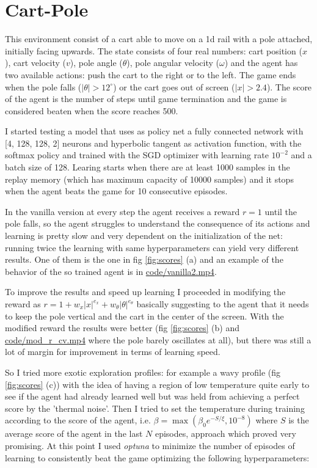 \documentclass[a4paper, 11pt]{article}
\begin{document}
\section{Cart-Pole}
  This environment consist of a cart able to move on a 1d rail with a pole attached, initially facing upwards. The state consists of four real numbers: cart position ($x$), cart velocity ($v$), pole angle ($\theta$), pole angular velocity ($\omega$) and the agent has two available actions: push the cart to the right or to the left. The game ends when the pole falls ($|\theta| > 12^{\circ}$) or the cart goes out of screen ($|x| > 2.4$). The score of the agent is the number of steps until game termination and the game is considered beaten when the score reaches 500.

  I started testing a model that uses as policy net a fully connected network with [4, 128, 128, 2] neurons and hyperbolic tangent as activation function, with the softmax policy and trained with the SGD optimizer with learning rate $10^{-2}$ and a batch size of 128. Learing starts when there are at least 1000 samples in the replay memory (which has maximum capacity of 10000 samples) and it stops when the agent beats the game for 10 consecutive episodes.

  In the vanilla version at every step the agent receives a reward $r = 1$ until the pole falls, so the agent struggles to understand the consequence of its actions and learning is pretty slow and very dependent on the initialization of the net: running twice the learning with same hyperparameters can yield very different results. One of them is the one in fig \ref{fig:scores} (a) and an example of the behavior of the so trained agent is in \url{code/vanilla2.mp4}.

  To improve the results and speed up learning I proceeded in modifying the reward as $r = 1 + w_x |x|^{e_x} + w_\theta |\theta|^{e_\theta}$ basically suggesting to the agent that it needs to keep the pole vertical and the cart in the center of the screen.
  With the modified reward the results were better (fig \ref{fig:scores} (b) and \url{code/mod_r_cv.mp4} where the pole barely oscillates at all), but there was still a lot of margin for improvement in terms of learning speed.

  So I tried more exotic exploration profiles: for example a wavy profile (fig \ref{fig:scores} (c)) with the idea of having a region of low temperature quite early to see if the agent had already learned well but was held from achieving a perfect score by the 'thermal noise'.
  Then I tried to set the temperature during training according to the score of the agent, i.e. $\beta = \max(\beta_0 e^{-S/\xi}, 10^{-8})$ where $S$ is the average score of the agent in the last $N$ episodes, approach which proved very promising. At this point I used \emph{optuna} to minimize the number of episodes of learning to consistently beat the game optimizing the following hyperparameters:
\end{document}
